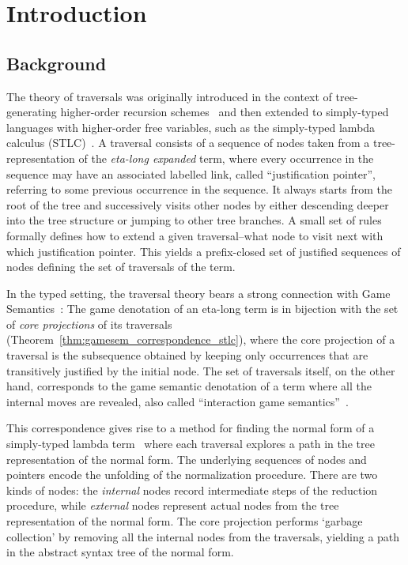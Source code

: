 \documentclass{elsarticle}
\theoremstyle{plain}
\theoremstyle{definition}
\begin{document}
\maketitle


\section{Introduction}

\subsection{Background}
The theory of traversals was originally introduced in the context of tree-generating higher-order recursion schemes~\cite{OngLics2006} and
then extended to simply-typed languages with higher-order free variables, such as the simply-typed lambda calculus (STLC)~\cite{BlumPhd}. A traversal consists of a sequence of nodes taken from a tree-representation of the \emph{eta-long expanded} term, where every occurrence in the sequence may have an associated labelled link, called ``justification pointer'', referring to some previous occurrence in the sequence. It always starts from the root of the tree and successively visits other nodes by either descending deeper into the tree structure or jumping to other tree branches. A small set of rules formally defines how to extend a given traversal--what node to visit next with which justification pointer. This yields a prefix-closed set of justified sequences of nodes defining the set of traversals of the term.

In the typed setting, the traversal theory bears a strong connection with Game Semantics~\cite{BlumPhd}: The game denotation of an eta-long term is in bijection with the set of \emph{core projections} of its traversals (Theorem~\ref{thm:gamesem_correspondence_stlc}), where the core projection of a traversal is the subsequence obtained by keeping only occurrences that are
transitively justified by the initial node.
The set of traversals itself, on the other hand, corresponds to the game semantic denotation of a term where all the internal moves are revealed, also called ``interaction game semantics''~\cite{BlumPhd}.

This correspondence gives rise to a method for finding the normal form of a simply-typed lambda term~\cite{BlumPhd,BlumGalop2008,Blum-LocalBeta2008}
where each traversal explores a path in the tree representation of the normal form. The underlying sequences of nodes and pointers encode the unfolding of the normalization procedure. There are two kinds of nodes: the \emph{internal} nodes record intermediate steps of the reduction procedure, while \emph{external} nodes represent actual nodes from the tree representation of the normal form. The core projection performs
`garbage collection' by removing all the internal nodes from the traversals,  yielding a path in the abstract syntax tree of the normal form.
\end{document}
